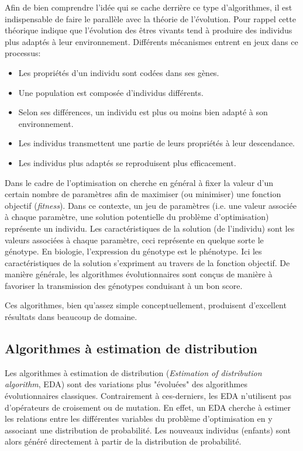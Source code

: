 \documentclass[a4paper, 11pt]{report}
\begin{document}
Afin de bien comprendre l'idée qui se cache derrière ce type d'algorithmes, il est indispensable de faire le parallèle avec la théorie de l'évolution. Pour rappel cette théorique indique que l'évolution des êtres vivants tend à produire des individus plus adaptés à leur environnement. %
Différents mécanismes entrent en jeux dans ce processus:
\begin{itemize}
\item Les propriétés d'un individu sont codées dans ses gènes.
\item Une population est composée d'individus différents.
\item Selon ses différences, un individu est plus ou moins bien adapté à son environnement.
\item Les individus transmettent une partie de leurs propriétés à leur descendance.
\item Les individus plus adaptés se reproduisent plus efficacement.
\end{itemize} %
Dans le cadre de l'optimisation on cherche en général à fixer la valeur d'un certain nombre de paramètres afin de maximiser (ou minimiser) une fonction objectif (\textit{fitness}). Dans ce contexte, un jeu de paramètres (i.e. une valeur associée à chaque paramètre, une solution potentielle du problème d'optimisation) représente un individu. Les caractéristiques de la solution (de l'individu) sont les valeurs associées à chaque paramètre, ceci représente en quelque sorte le génotype. En biologie, l'expression du génotype est le phénotype. Ici les caractéristiques de la solution s'expriment au travers de la fonction objectif. De manière générale, les algorithmes évolutionnaires sont conçus de manière à favoriser la transmission des génotypes conduisant à un bon score.  


Ces algorithmes, bien qu'assez simple conceptuellement, produisent d'excellent résultats dans beaucoup de domaine.

\subsection{Algorithmes à estimation de distribution}
Les algorithmes à estimation de distribution (\textit{Estimation of distribution algorithm}, EDA) sont des variations plus "évoluées" des algorithmes évolutionnaires classiques. Contrairement à ces-derniers, les EDA n'utilisent pas d'opérateurs de croisement ou de mutation. En effet, un EDA cherche à estimer les relations entre les différentes variables du problème d'optimisation en y associant une distribution de probabilité. Les nouveaux individus (enfants) sont alors généré directement à partir de la distribution de probabilité.
\end{document}
